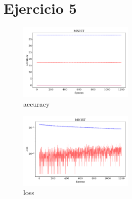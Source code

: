 \section*{Ejercicio 5}



\begin{figure}[H]
    \centering
    \includegraphics[width=0.5\textwidth]{plots/ejer_5_MNIST_acc.pdf}
    \caption{accuracy}
    \label{fig:ejer5_mnist_acc}
\end{figure} 

\begin{figure}[H]
    \centering
    \includegraphics[width=0.5\textwidth]{plots/ejer_5_MNIST_los.pdf}
    \caption{loss}
    \label{fig:ejer5_mnist_loss}
\end{figure} 

